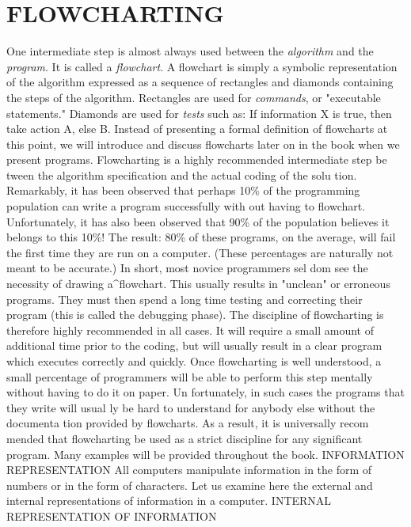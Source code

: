 \section*{FLOWCHARTING}

One intermediate step is almost always used between the
\textit{algorithm} and the \textit{program}. It is called a \textit{flowchart}. A flowchart is
simply a symbolic representation of the algorithm expressed as a
sequence of rectangles and diamonds containing the steps of the
algorithm. Rectangles are used for \textit{commands}, or "executable
statements." Diamonds are used for \textit{tests} such as: If information
X is true, then take action A, else B. Instead of presenting a formal
definition of flowcharts at this point, we will introduce and discuss
flowcharts later on in the book when we present programs.
Flowcharting is a highly recommended intermediate step be
tween the algorithm specification and the actual coding of the solu
tion. Remarkably, it has been observed that perhaps 10\% of the
programming population can write a program successfully with
out having to flowchart. Unfortunately, it has also been observed
that 90\% of the population believes it belongs to this 10\%! The
result: 80\% of these programs, on the average, will fail the first
time they are run on a computer. (These percentages are naturally
not meant to be accurate.) In short, most novice programmers sel
dom see the necessity of drawing a^flowchart. This usually results
in "unclean" or erroneous programs. They must then spend a long
time testing and correcting their program (this is called the
debugging phase). The discipline of flowcharting is therefore
highly recommended in all cases. It will require a small amount of
additional time prior to the coding, but will usually result in a clear
program which executes correctly and quickly. Once flowcharting
is well understood, a small percentage of programmers will be able
to perform this step mentally without having to do it on paper. Un
fortunately, in such cases the programs that they write will usual
ly be hard to understand for anybody else without the documenta
tion provided by flowcharts. As a result, it is universally recom
mended that flowcharting be used as a strict discipline for any
significant program. Many examples will be provided throughout
the book.
INFORMATION REPRESENTATION
All computers manipulate information in the form of numbers or
in the form of characters. Let us examine here the external and
internal representations of information in a computer.
INTERNAL REPRESENTATION OF INFORMATION
